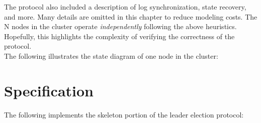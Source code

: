 The protocol also included a description of log synchronization, state
recovery, and more. Many details are omitted in this chapter to reduce modeling
costs. The N nodes in the cluster operate \textit{independently} following the
above heuristics. Hopefully, this highlights the complexity of verifying the
correctness of the protocol.\\

The following illustrates the state diagram of one node in the cluster:\\
\begin{center}
\end{center}

\section{Specification}

The following implements the skeleton portion of the leader election
protocol:\\

